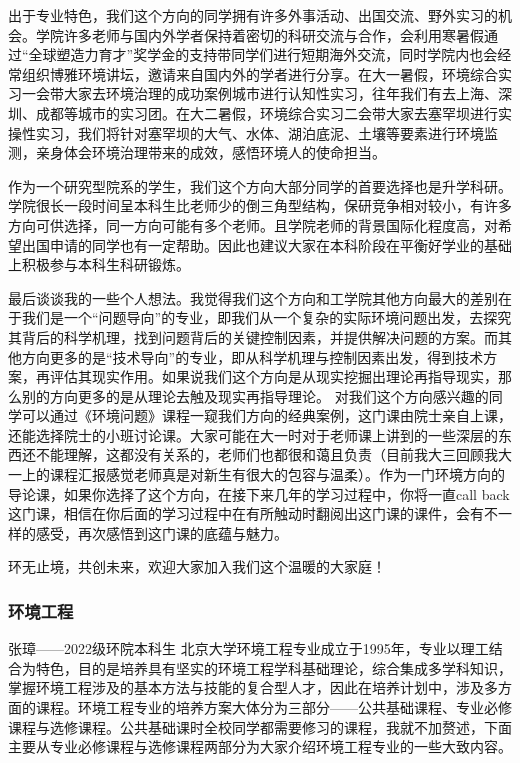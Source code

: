 \documentclass[11pt,oneside]{book}
\begin{document}
出于专业特色，我们这个方向的同学拥有许多外事活动、出国交流、野外实习的机会。学院许多老师与国内外学者保持着密切的科研交流与合作，会利用寒暑假通过“全球塑造力育才”奖学金的支持带同学们进行短期海外交流，同时学院内也会经常组织博雅环境讲坛，邀请来自国内外的学者进行分享。在大一暑假，环境综合实习一会带大家去环境治理的成功案例城市进行认知性实习，往年我们有去上海、深圳、成都等城市的实习团。在大二暑假，环境综合实习二会带大家去塞罕坝进行实操性实习，我们将针对塞罕坝的大气、水体、湖泊底泥、土壤等要素进行环境监测，亲身体会环境治理带来的成效，感悟环境人的使命担当。

作为一个研究型院系的学生，我们这个方向大部分同学的首要选择也是升学科研。学院很长一段时间呈本科生比老师少的倒三角型结构，保研竞争相对较小，有许多方向可供选择，同一方向可能有多个老师。且学院老师的背景国际化程度高，对希望出国申请的同学也有一定帮助。因此也建议大家在本科阶段在平衡好学业的基础上积极参与本科生科研锻炼。

最后谈谈我的一些个人想法。我觉得我们这个方向和工学院其他方向最大的差别在于我们是一个“问题导向”的专业，即我们从一个复杂的实际环境问题出发，去探究其背后的科学机理，找到问题背后的关键控制因素，并提供解决问题的方案。而其他方向更多的是“技术导向”的专业，即从科学机理与控制因素出发，得到技术方案，再评估其现实作用。如果说我们这个方向是从现实挖掘出理论再指导现实，那么别的方向更多的是从理论去触及现实再指导理论。
对我们这个方向感兴趣的同学可以通过《环境问题》课程一窥我们方向的经典案例，这门课由院士亲自上课，还能选择院士的小班讨论课。大家可能在大一时对于老师课上讲到的一些深层的东西还不能理解，这都没有关系的，老师们也都很和蔼且负责（目前我大三回顾我大一上的课程汇报感觉老师真是对新生有很大的包容与温柔）。作为一门环境方向的导论课，如果你选择了这个方向，在接下来几年的学习过程中，你将一直call back这门课，相信在你后面的学习过程中在有所触动时翻阅出这门课的课件，会有不一样的感受，再次感悟到这门课的底蕴与魅力。

环无止境，共创未来，欢迎大家加入我们这个温暖的大家庭！

\subsubsection{环境工程}
张璋——2022级环院本科生
北京大学环境工程专业成立于1995年，专业以理工结合为特色，目的是培养具有坚实的环境工程学科基础理论，综合集成多学科知识，掌握环境工程涉及的基本方法与技能的复合型人才，因此在培养计划中，涉及多方面的课程。环境工程专业的培养方案大体分为三部分——公共基础课程、专业必修课程与选修课程。公共基础课时全校同学都需要修习的课程，我就不加赘述，下面主要从专业必修课程与选修课程两部分为大家介绍环境工程专业的一些大致内容。
\end{document}
